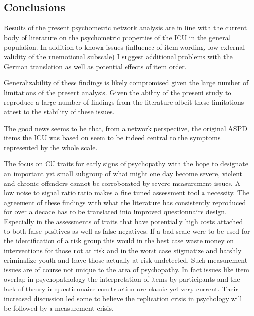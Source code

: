  
 
 \subsection{Conclusions}
 Results of the present psychometric network analysis are in line with the current body of literature on the psychometric properties of the ICU in the general population.
 In addition to known issues (influence of item wording, low external validity of the unemotional subscale) I suggest additional problems with the German translation as well as potential effects of item order.
 
 Generalizability of these findings is likely compromised given the large number of limitations of the present analysis.
 Given the ability of the present study to reproduce a large number of findings from the literature albeit these limitations attest to the stability of these issues.  
 
 The good news seems to be that, from a network perspective, the original ASPD items the ICU was based on seem to be indeed central to the symptoms represented by the whole scale.   
 
 The focus on CU traits for early signs of psychopathy with the hope to designate an important yet small subgroup of what might one day become severe, violent and chronic offenders cannot be corroborated by severe measurement issues. 
 A low noise to signal ratio ratio makes a fine tuned assessment tool a necessity. 
 The agreement of these findings with what the literature has consistently reproduced for over a decade has to be translated into improved questionnaire design. 
 Especially in the assessments of traits that have potentially high costs attached to both false positives as well as false negatives. If a bad scale were to be used for the identification of a risk group this would in the best case waste money on interventions for those not at risk and in the worst case stigmatize and harshly criminalize youth and leave those actually at risk undetected. Such measurement issues are of course not unique to the area of psychopathy. In fact issues like item overlap in psychopathology the interpretation of items by participants and the lack of theory in questionnaire construction are classic yet very current. Their increased discussion led some to believe the replication crisis in psychology will be followed by a measurement crisis. 
 

